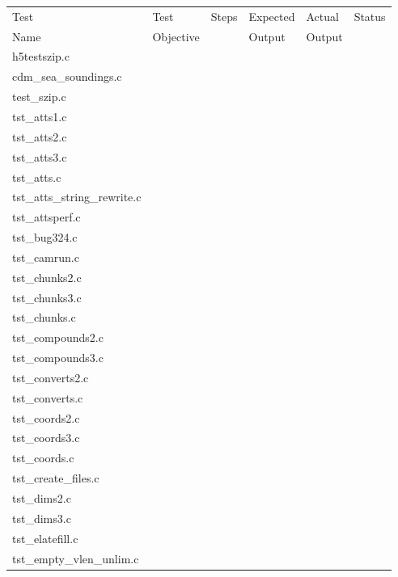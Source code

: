 \begin{table}[H]
\centering
\begin{tabular}{|m{2cm}|m{3cm}|m{3cm}|m{3cm}|m{3cm}|m{2cm}|}
\hline
Test & Test       & Steps   & Expected  & Actual & Status\\
Name & Objective  &         & Output    & Output &               \\ \hline \hline
h5testszip.c   &   &   &   &   &   \\ \hline
cdm\_sea\_soundings.c   &   &   &   &   &   \\ \hline
test\_szip.c   &   &   &   &   &   \\ \hline
tst\_atts1.c   &   &   &   &   &   \\ \hline
tst\_atts2.c   &   &   &   &   &   \\ \hline
tst\_atts3.c   &   &   &   &   &   \\ \hline
tst\_atts.c   &   &   &   &   &   \\ \hline
tst\_atts\_string\_rewrite.c   &   &   &   &   &   \\ \hline
tst\_attsperf.c   &   &   &   &   &   \\ \hline
tst\_bug324.c   &   &   &   &   &   \\ \hline
tst\_camrun.c   &   &   &   &   &   \\ \hline
tst\_chunks2.c   &   &   &   &   &   \\ \hline
tst\_chunks3.c   &   &   &   &   &   \\ \hline
tst\_chunks.c   &   &   &   &   &   \\ \hline
tst\_compounds2.c   &   &   &   &   &   \\ \hline
tst\_compounds3.c   &   &   &   &   &   \\ \hline
tst\_converts2.c   &   &   &   &   &   \\ \hline
tst\_converts.c   &   &   &   &   &   \\ \hline
tst\_coords2.c   &   &   &   &   &   \\ \hline
tst\_coords3.c   &   &   &   &   &   \\ \hline
tst\_coords.c   &   &   &   &   &   \\ \hline
tst\_create\_files.c   &   &   &   &   &   \\ \hline
tst\_dims2.c   &   &   &   &   &   \\ \hline
tst\_dims3.c   &   &   &   &   &   \\ \hline
tst\_elatefill.c   &   &   &   &   &   \\ \hline
tst\_empty\_vlen\_unlim.c   &   &   &   &   &   \\ \hline

\end{tabular}
\end{table}
